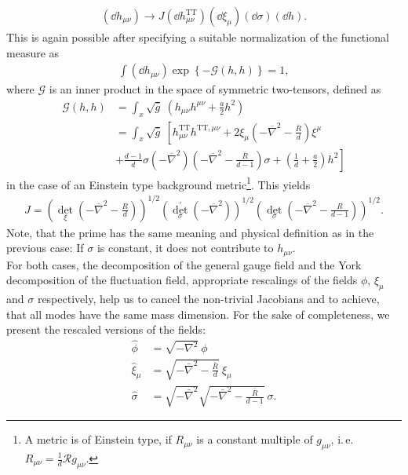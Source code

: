 \begin{align}
	\left(\dd h_{\mu\nu}\right) \longrightarrow J	\left(\dd h_{\mu\nu}^{\mathrm{TT}}\right) \left(\dd\xi_{\mu}\right)\left(\dd\sigma\right)\left(\dd h\right).
\end{align}
This is again possible after specifying a suitable normalization of the functional measure as
\begin{align}
	\int (\dd h_{\mu\nu}) \exp\left\{-\mathcal{G}(h, h)\right\} = 1,
\end{align}
where $\mathcal{G}$ is an inner product in the space of symmetric two-tensors, defined as
\begin{equation}
\begin{aligned} 
\mathcal{G}(h, h)&= \int_x \sqrt{\bar{g}} \ \left(h_{\mu \nu} h^{\mu \nu}+\frac{a}{2} h^{2}\right) \\[10pt]
&= \int_x \sqrt{\bar{g}} \ \left[h^{\mathrm{TT}}_{\mu \nu} h^{\mathrm{TT}, \mu \nu}+2 \xi_{\mu}\left(-\overline{\nabla}^{2}-\frac{\overline{R}}{d}\right) \xi^{\mu}\right. \\
&+\left.\frac{d-1}{d} \sigma\left(-\overline{\nabla}^{2}\right)\left(-\overline{\nabla}^{2}-\frac{\overline{R}}{d-1}\right) \sigma+\left(\frac{1}{d}+\frac{a}{2}\right) h^{2} \right] 
\end{aligned}
\end{equation}
in the case of an Einstein type background metric\footnote{A metric is of Einstein type, if $R_{\mu\nu}$ is a constant multiple of $g_{\mu\nu}$, i.\,e. $R_{\mu\nu} = \frac{1}{d} \mathcal{R} g_{\mu\nu}$.}. This yields
\begin{align}
	J=\left(\operatorname{det}_{\xi}\left(-\overline{\nabla}^{2}-\frac{R}{d}\right)\right)^{1 / 2}\left(\operatorname{det}_{\sigma}^{\prime}\left(-\overline{\nabla}^{2}\right)\right)^{1 / 2}\left(\operatorname{det}_{\sigma}\left(-\overline{\nabla}^{2}-\frac{R}{d-1}\right)\right)^{1 / 2}.
\end{align}
Note, that the prime has the same meaning and physical definition as in the previous case: If $\sigma$ is constant, it does not contribute to $h_{\mu\nu}$. \\
 For both cases, the decomposition of the general gauge field and the York decomposition of the fluctuation field, appropriate rescalings of the fields $\phi$, $\xi_{\mu}$ and $\sigma$ respectively, help us to cancel the non-trivial Jacobians and to achieve, that all modes have the same mass dimension. For the sake of completeness, we present the rescaled versions of the fields:
 \begin{align}
\hat{\phi} &= \sqrt{-\nabla^2}\ \phi \\[10pt]
 \hat{\xi}_{\mu} &= \sqrt{-\bar{\nabla}^{2}-\frac{\bar{R}}{d}}\  \xi_{\mu} \\[10pt]
  \hat{\sigma} &= \sqrt{-\bar{\nabla}^{2}} \sqrt{-\bar{\nabla}^{2}-\frac{\bar{R}}{d-1}}\ \sigma. 
 \end{align}
